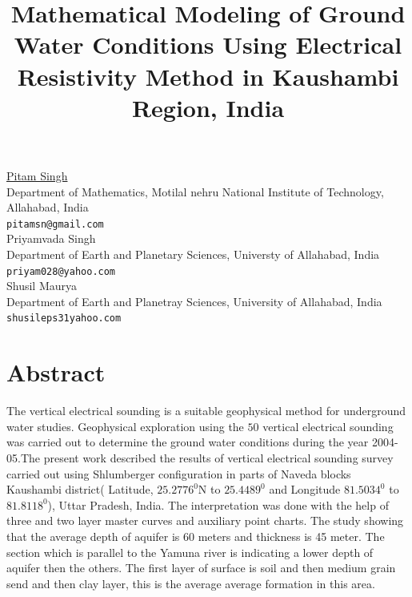 \documentclass[article,A4,11pt]{llncs}%
\begin{document}
\title{Mathematical Modeling of Ground Water Conditions Using Electrical Resistivity Method in Kaushambi Region, India}
 \author{} \institute{}
\maketitle
\begin{center}
{\large \underline{Pitam Singh}}\\
Department of Mathematics, Motilal nehru National Institute of Technology, Allahabad, India\\
{\tt pitamsn@gmail.com}
\\ \vspace{4mm}
{\large Priyamvada Singh}\\
Department of  Earth and Planetary Sciences, Universty of Allahabad,  India\\
{\tt priyam028@yahoo.com}
\\ \vspace{4mm}
{\large Shusil Maurya}\\
Department of Earth and Planetray Sciences, University of Allahabad, India\\
{\tt shusileps31yahoo.com}
\end{center}

\section*{Abstract}
The vertical electrical sounding is a suitable geophysical method for underground water studies. Geophysical exploration using the $50$ vertical electrical sounding was carried out to determine the ground water conditions during the year 2004-05.The present work described the results of vertical electrical sounding survey carried out using Shlumberger configuration in parts of Naveda blocks Kaushambi district( Latitude, $25.2776^{0}$N to $25.4489^0$ and Longitude $81.5034^0$ to $81.8118^0$), Uttar Pradesh, India. The interpretation was done with the help of three and two layer master curves and auxiliary point charts. The study showing that the average depth of aquifer is $60$ meters and thickness is 45 meter. The section which is parallel to the Yamuna river is indicating a lower depth of aquifer then the others. The first layer of surface is soil and then medium grain send and then clay layer, this is the average average formation in this area.
\end{document}
